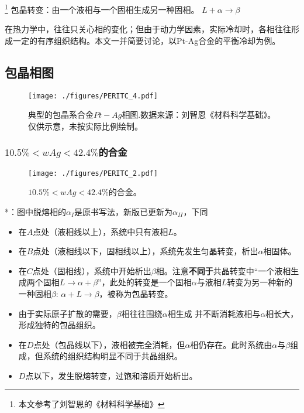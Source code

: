 
\footnote{本文参考了刘智恩的《材料科学基础》}
包晶转变：由一个液相与一个固相生成另一种固相。 $L + \alpha \rightarrow \beta$

在热力学中，往往只关心相的变化；但由于动力学因素，实际冷却时，各相往往形成一定的有序组织结构。本文一并简要讨论，以Pt-Ag合金的平衡冷却为例。

\subsection{包晶相图}

\begin{figure}[ht]
\centering
\texttt{[image: ./figures/PERITC\_4.pdf]}
\caption{典型的包晶系合金$Pt-Ag$相图.数据来源：刘智恩《材料科学基础》。仅供示意，未按实际比例绘制。} \label{PERITC_fig4}
\end{figure}

\subsubsection{$10.5\%<wAg<42.4\%$的合金} 
\begin{figure}[ht]
\centering
\texttt{[image: ./figures/PERITC\_2.pdf]}
\caption{$10.5\%<wAg<42.4\%$的合金。} \label{PERITC_fig2}
\end{figure}
*：图中脱熔相的$\alpha_I$是原书写法，新版已更新为$\alpha_{II}$，下同

\begin{itemize}
\item 在$A$点处（液相线以上），系统中只有液相$L$。
\item 在$B$点处（液相线以下，固相线以上），系统先发生匀晶转变，析出$\alpha$相固体。
\item 在$C$点处（固相线），系统中开始析出$\beta$相。注意\textbf{不同于}共晶转变中“一个液相生成两个固相$L\to\alpha+\beta$”，此处的转变是一个固相$\alpha$与液相$L$转变为另一种新的一种固相$\beta$: $\alpha+L\to\beta$，被称为包晶转变。
\item 由于实际原子扩散的需要，$\beta$相往往围绕$\alpha$相生成
并不断消耗液相与$\alpha$相长大，形成独特的包晶组织。
\item 在$D$点处（包晶线以下），液相被完全消耗，但$\alpha$相仍存在。此时系统由$\alpha$与$\beta$组成，但系统的组织结构明显不同于共晶组织。
\item $D$点以下，发生脱熔转变，过饱和溶质开始析出。
\end{itemize}

